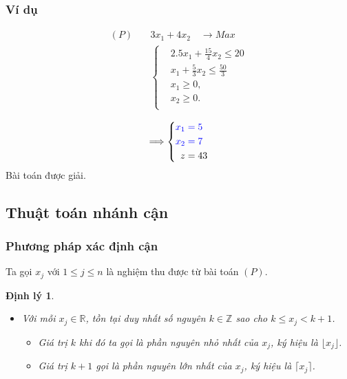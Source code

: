 \documentclass[12pt,a4paper]{report}
\newtheorem{dl}{Định lý}
\begin{document}
\subsubsection*{Ví dụ}
        \begin{equation*}
        \begin{split}
            (P) \quad & 3x_1 + 4x_2 \quad \longrightarrow Max \\
            & \left\{\begin{split}
            & 2.5x_1 + \frac{15}{4}x_2 \leq 20 \\
            & x_1 + \frac{5}{3}x_2 \leq \frac{50}{3} \\
            &x_1 \geq 0, \\
            &x_2 \geq 0. \\
            \end{split}\right. \\
        \end{split}
        \end{equation*}
        \begin{equation*}
            \Longrightarrow
            \left\{\begin{split}
            \color{blue} x_1 &\color{blue} = 5 \\
            \color{blue} x_2 &\color{blue} = 7 \\
            z& =43
        \end{split}\right.
        \end{equation*}
    Bài toán được giải.


\subsection*{Thuật toán nhánh cận}

\subsubsection*{Phương pháp xác định cận}
Ta gọi $x_j$ với $1 \leq j \leq n$ là nghiệm thu được từ bài toán $(P)$.
\begin{dl}\label{cmnguyen}
	\phantom{}
\begin{itemize}
\item Với mỗi $x_j \in \mathbb{R}$, tồn tại duy nhất số nguyên $k \in \mathbb{Z}$ sao cho $k \leq x_j < k+1$.
\begin{itemize}
\item Giá trị $k$ khi đó ta gọi là phần nguyên nhỏ nhất của $x_j$, ký hiệu là $\lfloor x_j \rfloor$.
\item Giá trị $k+1$ gọi là phần nguyên lớn nhất của $x_j$, ký hiệu là $\lceil x_j \rceil$.
\end{itemize}
\end{itemize}
\end{dl}
\end{document}
